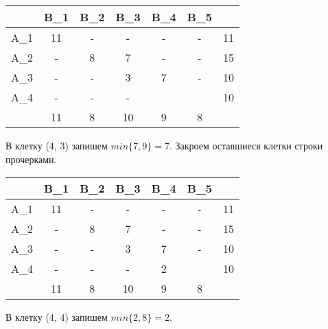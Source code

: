 \documentclass{article}
\begin{document}
\begin{table}[H]
    \centering
    \begin{tabular}{|c|c|c|c|c|c| |c|}
    \hline
        &\cellcolor{myGren} B_1 & \cellcolor{myGren}B_2 & \cellcolor{myGren}B_3 & \cellcolor{myGren}B_4 & \cellcolor{myGren} B_5 &  \\ \hline
       \cellcolor{myGren} A_1 &  11 & - &- & - & - & 11\\ \hline
       \cellcolor{myGren} A_2 & - & 8 & 7 & - & - & 15\\  \hline
       \cellcolor{myGren} A_3 & - & - & 3 & \cellcolor{Gray}7 &\cellcolor{Gray} - & \cellcolor{Gray}10\\ \hline
       \cellcolor{myGren} A_4 & - & - & - & \cellcolor{Gray}  &  & 10\\ \hline \hline
            & 11 &  8 & 10 &\cellcolor{Gray} 9 & 8 & \\
        \hline
    \end{tabular}
    \label{tab:my_label}
\end{table}

\noindent В клетку (4, 3) запишем $min\{7, 9\} = 7$. Закроем оставшиеся клетки строки прочерками.

\begin{table}[H]
    \centering
    \begin{tabular}{|c|c|c|c|c|c| |c|}
    \hline
        &\cellcolor{myGren} B_1 & \cellcolor{myGren}B_2 & \cellcolor{myGren}B_3 & \cellcolor{myGren}B_4 & \cellcolor{myGren} B_5 &  \\ \hline
       \cellcolor{myGren} A_1 &  11 & - &- & - & - & 11\\ \hline
       \cellcolor{myGren} A_2 & - & 8 & 7 & - & - & 15\\  \hline
       \cellcolor{myGren} A_3 & - & - & 3 & 7 & - & 10\\ \hline
       \cellcolor{myGren} A_4 & - & - & - & \cellcolor{Gray}2 & \cellcolor{Gray} & \cellcolor{Gray}10\\ \hline \hline
            & 11 &  8 & 10 &\cellcolor{Gray} 9 & 8 & \\
        \hline
    \end{tabular}
    \label{tab:my_label}
\end{table}

\noindent В клетку (4, 4) запишем $min\{2, 8\} = 2$.
\end{document}
